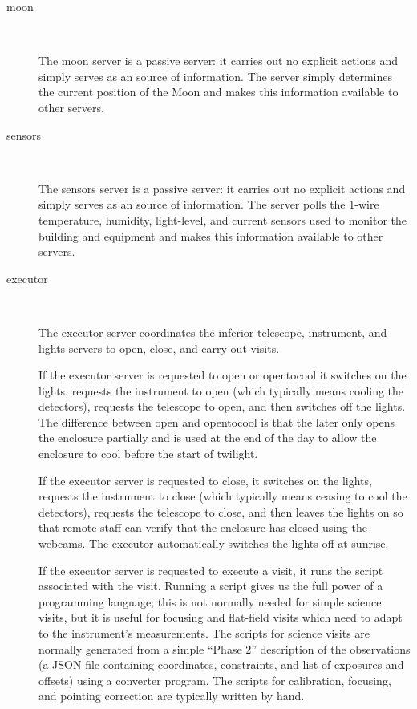 \documentclass{article}
\newcommand{\server}[1]{{\ttfamily #1}}
\newcommand{\request}[1]{{\ttfamily #1}}
\begin{document}
\begin{description}
\item[\server{moon}]~

The \server{moon} server is a passive server: it carries out no explicit actions and simply serves as an source of information. The server simply determines the current position of the Moon and makes this information available to other servers.

\item[\server{sensors}]~

The \server{sensors} server is a passive server: it carries out no explicit actions and simply serves as an source of information. The server polls the 1-wire temperature, humidity, light-level, and current sensors used to monitor the building and equipment and makes this information available to other servers.

\item[\server{executor}]~

The \server{executor} server coordinates the inferior \server{telescope}, \server{instrument}, and \server{lights} servers to open, close, and carry out visits.

If the \server{executor} server is requested to \request{open} or \request{opentocool} it switches on the lights, requests the instrument to open (which typically means cooling the detectors), requests the telescope to open, and then switches off the lights. The difference between \request{open} and \request{opentocool} is that the later only opens the enclosure partially and is used at the end of the day to allow the enclosure to cool before the start of twilight.

If the \server{executor} server is requested to \request{close}, it switches on the lights, requests the instrument to close (which typically means ceasing to cool the detectors), requests the telescope to close, and then leaves the lights on so that remote staff can verify that the enclosure has closed using the webcams. The executor automatically switches the lights off at sunrise.

If the \server{executor} server is requested to \request{execute} a visit, it runs the script associated with the visit. Running a script gives us the full power of a programming language; this is not normally needed for simple science visits, but it is useful for focusing and flat-field visits which need to adapt to the instrument’s measurements. The scripts for science visits are normally generated from a simple “Phase 2” description of the observations (a JSON file containing coordinates, constraints, and list of exposures and offsets) using a converter program. The scripts for calibration, focusing, and pointing correction are typically written by hand.


\end{description}
\end{document}
